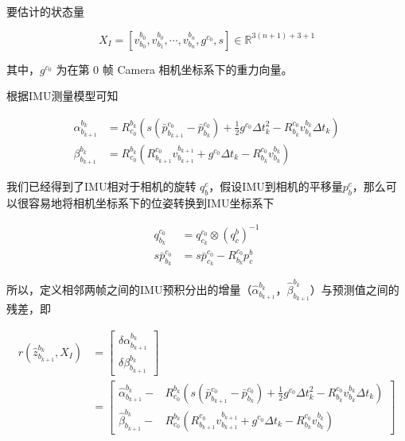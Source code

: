 \documentclass[12pt,a4paper]{article}
\begin{document}
要估计的状态量

\begin{equation}
X_{I}=
[v^{b_{0}}_{b_{0}}, v^{b_{0}}_{b_{1}}, \cdots, v^{b_{n}}_{b_{n}}, g^{c_{0}}, s]
\in \mathbb{R}^{3(n+1)+3+1}
\end{equation}

其中，$g^{c_{0}}$ 为在第 0 帧 Camera 相机坐标系下的重力向量。

根据IMU测量模型可知

\begin{equation}
\begin{aligned}
\alpha^{b_{k}}_{b_{k+1}} &= R^{b_{k}}_{c_{0}}(s(\bar{p}^{c_{0}}_{b_{k+1}}-\bar{p}^{c_{0}}_{b_{k}}) +
\frac{1}{2}g^{c_{0}}\Delta t_{k}^{2} -
R^{c_0}_{b_k} v^{b_k}_{b_{k}} \Delta t_{k}) \\
\beta ^{b_{k}}_{b_{k+1}} &=
R^{b_{k}}_{c_{0}}(R^{c_0}_{b_{k+1}} v^{b_{k+1}}_{b_{k+1}} +
g^{c_{0}}\Delta t_{k} -
R^{c_0}_{b_k} v^{b_k}_{b_{k}})
\end{aligned}
\end{equation}

我们已经得到了IMU相对于相机的旋转 $q_{b}^{c}$，假设IMU到相机的平移量$p_{b}^{c}$，那么可以很容易地将相机坐标系下的位姿转换到IMU坐标系下

\begin{equation}
\begin{aligned}
q_{b_{k}}^{c_{0}} &=
q^{c_{0}}_{c_{k}}\otimes (q_{c}^{b})^{-1}  \\
s\bar{p}^{c_{0}}_{b_{k}} &=
s\bar{p}^{c_{0}}_{c_{k}} - R^{c_{0}}_{b_{k}}p_{c}^{b}
\end{aligned}
\end{equation}

所以，定义相邻两帧之间的IMU预积分出的增量（${\hat{\alpha}}_{b_{k+1}}^{b_{k}}$，${\hat{\beta}}_{b_{k+1}}^{b_{k}}$）与预测值之间的残差，即

\begin{equation}
\begin{aligned}
r(\hat{z}^{b_{k}}_{b_{k+1}}, X_I) &=
\begin{bmatrix}
\delta \alpha^{b_{k}}_{b_{k+1}} \\
\delta \beta ^{b_{k}}_{b_{k+1}}
\end{bmatrix} \\ &=
\begin{bmatrix}
\hat{\alpha}^{b_{k}}_{b_{k+1}} -& R^{b_{k}}_{c_{0}}(s(\bar{p}^{c_{0}}_{b_{k+1}}-\bar{p}^{c_{0}}_{b_{k}}) +
\frac{1}{2}g^{c_{0}}\Delta t_{k}^{2} -
R^{c_0}_{b_k} v^{b_k}_{b_{k}} \Delta t_{k})\\
\hat{\beta}^{b_{k}}_{b_{k+1}} -&
R^{b_{k}}_{c_{0}}(R^{c_0}_{b_{k+1}} v^{b_{k+1}}_{b_{k+1}} +
g^{c_{0}}\Delta t_{k} -
R^{c_0}_{b_k} v^{b_k}_{b_{k}})
\end{bmatrix}
\end{aligned}
\end{equation}
\end{document}
